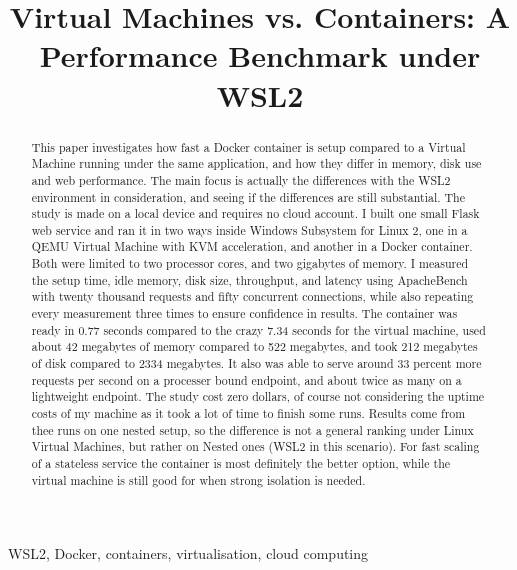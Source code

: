 \documentclass[conference,a4paper]{IEEEtran}
\begin{document}
\title{Virtual Machines vs. Containers: A Performance Benchmark under WSL2}

\maketitle

\begin{abstract}
\mdseries This paper investigates how fast a Docker container is setup compared to a Virtual Machine running under the same application, and how they differ in memory, disk use and web performance. The main focus is actually the differences with the WSL2 environment in consideration, and seeing if the differences are still substantial. The study is made on a local device and requires no cloud account. I built one small Flask web service and ran it in two ways inside Windows Subsystem for Linux 2, one in a QEMU Virtual Machine with KVM acceleration, and another in a Docker container. Both were limited to two processor cores, and two gigabytes of memory. I measured the setup time, idle memory, disk size, throughput, and latency using ApacheBench with twenty thousand requests and fifty concurrent connections, while also repeating every measurement three times to ensure confidence in results. The container was ready in 0.77 seconds compared to the crazy 7.34 seconds for the virtual machine, used about 42 megabytes of memory compared to 522 megabytes, and took 212 megabytes of disk compared to 2334 megabytes. It also was able to serve around 33 percent more requests per second on a processer bound endpoint, and about twice as many on a lightweight endpoint. The study cost zero dollars, of course not considering the uptime costs of my machine as it took a lot of time to finish some runs. Results come from thee runs on one nested setup, so the difference is not a general ranking under Linux Virtual Machines, but rather on Nested ones (WSL2 in this scenario). For fast scaling of a stateless service the container is most definitely the better option, while the virtual machine is still good for when strong isolation is needed.
\end{abstract}

\begin{IEEEkeywords}
WSL2, Docker, containers, virtualisation, cloud computing
\end{IEEEkeywords}
\end{document}

